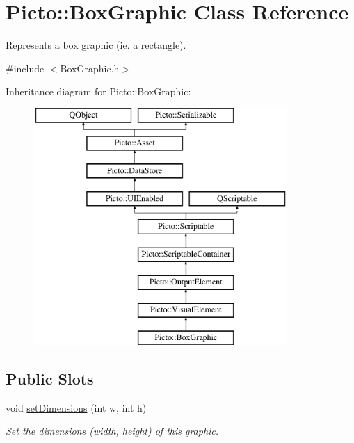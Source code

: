 \hypertarget{class_picto_1_1_box_graphic}{\section{Picto\-:\-:Box\-Graphic Class Reference}
\label{class_picto_1_1_box_graphic}
}


Represents a box graphic (ie. a rectangle).  




{\ttfamily \#include $<$Box\-Graphic.\-h$>$}

Inheritance diagram for Picto\-:\-:Box\-Graphic\-:\begin{figure}[H]
\begin{center}
\leavevmode
\includegraphics[height=9.000000cm]{class_picto_1_1_box_graphic}
\end{center}
\end{figure}
\subsection*{Public Slots}
\begin{DoxyCompactItemize}
\item 
\hypertarget{class_picto_1_1_box_graphic_aecd31b651050befec58a8ba0ce765afd}{void \hyperlink{class_picto_1_1_box_graphic_aecd31b651050befec58a8ba0ce765afd}{set\-Dimensions} (int w, int h)}\label{class_picto_1_1_box_graphic_aecd31b651050befec58a8ba0ce765afd}

\begin{DoxyCompactList}\small\item\em Set the dimensions (width, height) of this graphic. \end{DoxyCompactList}\end{DoxyCompactItemize}
